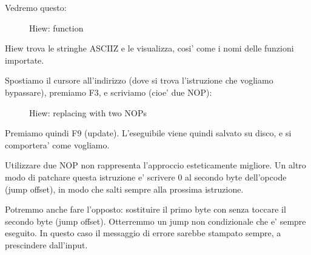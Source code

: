 Vedremo questo:

\begin{figure}[H]
\centering
{}
\caption{Hiew: \main function}
\label{fig:scanf_ex3_hiew_1}
\end{figure}

Hiew trova le stringhe \ac{ASCIIZ} e le visualizza, cosi' come i nomi delle funzioni importate.

\clearpage
Spostiamo il cursore all'indirizzo  (dove si trova l'istruzione  che vogliamo bypassare), premiamo F3, e scriviamo  (cioe' due \ac{NOP}):

\begin{figure}[H]
\centering
{}
\caption{Hiew: replacing  with two \ac{NOP}s}
\label{fig:scanf_ex3_hiew_2}
\end{figure}

Premiamo quindi F9 (update). L'eseguibile viene quindi salvato su disco, e si comportera' come vogliamo.

Utilizzare due \ac{NOP} non rappresenta l'approccio esteticamente migliore.
Un altro modo di patchare questa istruzione e' scrivere 0 al secondo byte dell'opcode (\gls{jump offset}), 
in modo che  salti sempre alla prossima istruzione.

Potremmo anche fare l'opposto: sostituire il primo byte con  senza toccare il secondo byte (\gls{jump offset}).
Otterremmo un jump non condizionale che e' sempre eseguito.
In questo caso il messaggio di errore sarebbe stampato sempre, a prescindere dall'input.

